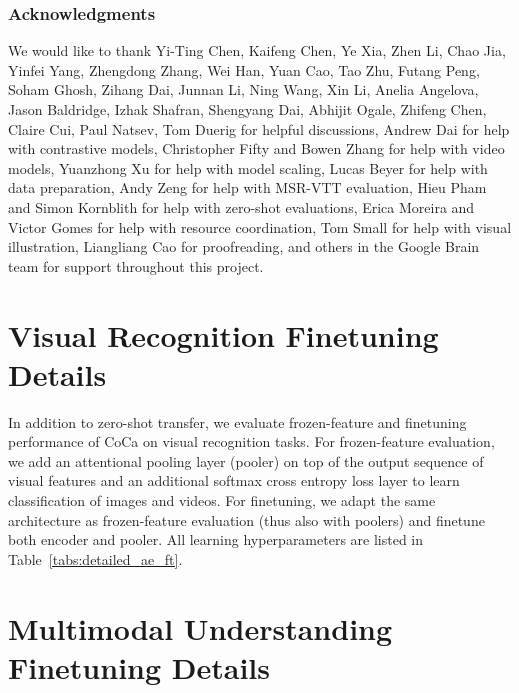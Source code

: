 \documentclass{article}
\begin{document}




\subsubsection*{Acknowledgments}
We would like to thank Yi-Ting Chen, Kaifeng Chen, Ye Xia, Zhen Li, Chao Jia, Yinfei Yang, Zhengdong Zhang, Wei Han, Yuan Cao, Tao Zhu, Futang Peng, Soham Ghosh, Zihang Dai, Junnan Li, Ning Wang, Xin Li, Anelia Angelova, Jason Baldridge, Izhak Shafran, Shengyang Dai, Abhijit Ogale, Zhifeng Chen, Claire Cui, Paul Natsev, Tom Duerig for helpful discussions, Andrew Dai for help with contrastive models, Christopher Fifty and Bowen Zhang for help with video models, Yuanzhong Xu for help with model scaling, Lucas Beyer for help with data preparation, Andy Zeng for help with MSR-VTT evaluation, Hieu Pham and Simon Kornblith for help with zero-shot evaluations, Erica Moreira and Victor Gomes for help with resource coordination, Tom Small for help with visual illustration, Liangliang Cao for proofreading, and others in the Google Brain team for support throughout this project.




\clearpage

\appendix

\section{Visual Recognition Finetuning Details}
\label{secs:detailed_ae_ft}

In addition to zero-shot transfer, we evaluate frozen-feature and finetuning performance of CoCa on visual recognition tasks. For frozen-feature evaluation, we add an attentional pooling layer (pooler) on top of the output sequence of visual features and an additional softmax cross entropy loss layer to learn classification of images and videos. For finetuning, we adapt the same architecture as frozen-feature evaluation (thus also with poolers) and finetune both encoder and pooler. All learning hyperparameters are listed in Table~\ref{tabs:detailed_ae_ft}.

\section{Multimodal Understanding Finetuning Details}
\label{secs:detailed_vl}

\end{document}
